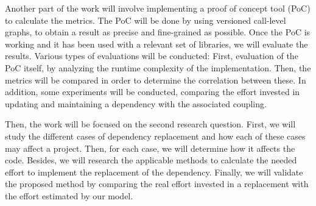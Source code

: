 \documentclass[a4paper]{article}
\begin{document}
Another part of the work will involve implementing a proof of concept tool (PoC) to calculate the metrics. The PoC will be done by using versioned call-level graphs, to obtain a result as precise and fine-grained as possible.
Once the PoC is working and it has been used with a relevant set of libraries, we will evaluate the results. Various types of evaluations will be conducted: First, evaluation of the PoC itself, by analyzing the runtime complexity of the implementation. Then, the metrics will be compared in order to determine the correlation between these. In addition, some experiments will be conducted, comparing the effort invested in updating and maintaining a dependency with the associated coupling.

Then, the work will be focused on the second research question. First, we will study the different cases of dependency replacement and how each of these cases may affect a project. Then, for each case, we will determine how it affects the code. Besides, we will research the applicable methods to calculate the needed effort to implement the replacement of the dependency. Finally, we will validate the proposed method by comparing the real effort invested in a replacement with the effort estimated by our model.



\end{document}
